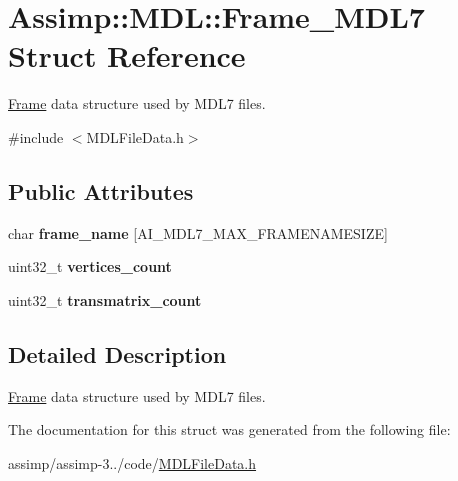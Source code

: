 \hypertarget{struct_assimp_1_1_m_d_l_1_1_frame___m_d_l7}{\section{Assimp\+:\+:M\+D\+L\+:\+:Frame\+\_\+\+M\+D\+L7 Struct Reference}
\label{struct_assimp_1_1_m_d_l_1_1_frame___m_d_l7}
}


\hyperlink{struct_assimp_1_1_m_d_l_1_1_frame}{Frame} data structure used by M\+D\+L7 files.  




{\ttfamily \#include $<$M\+D\+L\+File\+Data.\+h$>$}

\subsection*{Public Attributes}
\begin{DoxyCompactItemize}
\item 
\hypertarget{struct_assimp_1_1_m_d_l_1_1_frame___m_d_l7_a9f63029ee4416c327d0390573ed346ad}{char {\bfseries frame\+\_\+name} \mbox{[}A\+I\+\_\+\+M\+D\+L7\+\_\+\+M\+A\+X\+\_\+\+F\+R\+A\+M\+E\+N\+A\+M\+E\+S\+I\+Z\+E\mbox{]}}\label{struct_assimp_1_1_m_d_l_1_1_frame___m_d_l7_a9f63029ee4416c327d0390573ed346ad}

\item 
\hypertarget{struct_assimp_1_1_m_d_l_1_1_frame___m_d_l7_a6378072fa8010ffd20bedacc2456de3b}{uint32\+\_\+t {\bfseries vertices\+\_\+count}}\label{struct_assimp_1_1_m_d_l_1_1_frame___m_d_l7_a6378072fa8010ffd20bedacc2456de3b}

\item 
\hypertarget{struct_assimp_1_1_m_d_l_1_1_frame___m_d_l7_a0bb9579ab0f43afa8db2c1a641c1cf06}{uint32\+\_\+t {\bfseries transmatrix\+\_\+count}}\label{struct_assimp_1_1_m_d_l_1_1_frame___m_d_l7_a0bb9579ab0f43afa8db2c1a641c1cf06}

\end{DoxyCompactItemize}


\subsection{Detailed Description}
\hyperlink{struct_assimp_1_1_m_d_l_1_1_frame}{Frame} data structure used by M\+D\+L7 files. 

The documentation for this struct was generated from the following file\+:\begin{DoxyCompactItemize}
\item 
assimp/assimp-\/3../code/\hyperlink{_m_d_l_file_data_8h}{M\+D\+L\+File\+Data.\+h}\end{DoxyCompactItemize}
